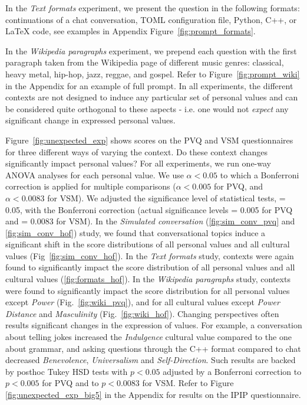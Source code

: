 In the \textit{Text formats} experiment, we present the question in the following formats: continuations of a chat conversation, TOML configuration file, Python, C++, or LaTeX code, see examples in Appendix Figure~\ref{fig:prompt_formats}.

In the \textit{Wikipedia paragraphs} experiment, we prepend each question with the first paragraph taken from the Wikipedia page of different music genres: classical, heavy metal, hip-hop, jazz, reggae, and gospel. Refer to Figure~\ref{fig:prompt_wiki} in the Appendix for an example of full prompt. In all experiments, the different contexts are not designed to induce any particular set of personal values and can be considered quite orthogonal to these aspects - i.e. one would not \textit{expect} any significant change in expressed personal values. 

Figure~\ref{fig:unexpected_exp} shows scores on the PVQ and VSM questionnaires for three different ways of varying the context. Do these context changes significantly impact personal values? For all experiments, we run one-way ANOVA analyses for each personal value. We use $\alpha<0.05$ to which a Bonferroni correction is applied for multiple comparisons ($\alpha<0.005$ for PVQ, and $\alpha<0.0083$ for VSM). We adjusted the significance level of statistical tests, \textalpha= 0.05, with the Bonferroni correction (actual significance levels \textalpha= 0.005 for PVQ and \textalpha= 0.0083 for VSM). In the \textit{Simulated conversation} (\ref{fig:sim_conv_pvq} and \ref{fig:sim_conv_hof}) study, we found that conversational topics induce a significant shift in the score distributions of all personal values and all cultural values (Fig~\ref{fig:sim_conv_hof}).
In the \textit{Text formats} study, contexts were again found to significantly impact the score distribution of all personal values and all cultural values (\ref{fig:formats_hof}).
In the \textit{Wikipedia paragraphs} study, contexts were found to significantly impact the score distribution for all personal values except \textit{Power} (Fig.~\ref{fig:wiki_pvq}), and for all cultural values except \textit{Power Distance} and \textit{Masculinity} (Fig.~\ref{fig:wiki_hof}). 
Changing perspectives often results significant changes in the expression of values. For example, a conversation about telling jokes increased the \textit{Indulgence} cultural value compared to the one about grammar, and asking questions through the C++ format compared to chat decreased \textit{Benevolence}, \textit{Universalism} and \textit{Self-Direction}.
Such results are  backed by posthoc Tukey HSD tests with $p<0.05$ adjusted by a Bonferroni correction to $p<0.005$ for PVQ and to $p<0.0083$ for VSM. Refer to Figure \ref{fig:unexpected_exp_big5} in the Appendix for results on the IPIP questionnaire.

